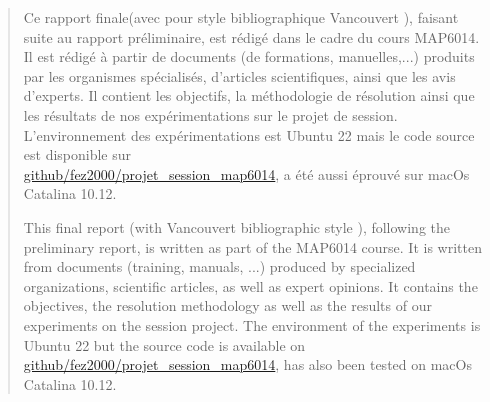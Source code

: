 {}
\begin{abstract}
\setcounter{page}{3}
\protect\thispagestyle{fancy}
\doublespacing
Ce rapport finale(avec pour style bibliographique Vancouvert \cite{styleBliblio}), faisant suite au rapport préliminaire,  est rédigé dans le cadre du cours MAP6014. Il est rédigé à partir de documents (de formations, manuelles,...) produits par les organismes spécialisés, d'articles scientifiques, ainsi que les avis d'experts. Il contient les objectifs, la méthodologie de résolution ainsi que les résultats de nos expérimentations sur le projet de session. L’environnement
des expérimentations est Ubuntu 22 mais le code source est disponible
sur \\\href{https://github.com/fez2000/projet_session_map6014}{github/fez2000/projet\_session\_map6014}, a été aussi éprouvé sur macOs Catalina 10.12.
\newline


\noindent This final report (with Vancouvert bibliographic style \cite{styleBliblio}), following the preliminary report, is written as part of the MAP6014 course. It is written from documents (training, manuals, ...) produced by specialized organizations, scientific articles, as well as expert opinions. It contains the objectives, the resolution methodology as well as the results of our experiments on the session project. The environment
of the experiments is Ubuntu 22 but the source code is available
on \\\href{https://github.com/fez2000/projet_session_map6014}{github/fez2000/projet\_session\_map6014}, has also been tested on macOs Catalina 10.12.
\end{abstract}